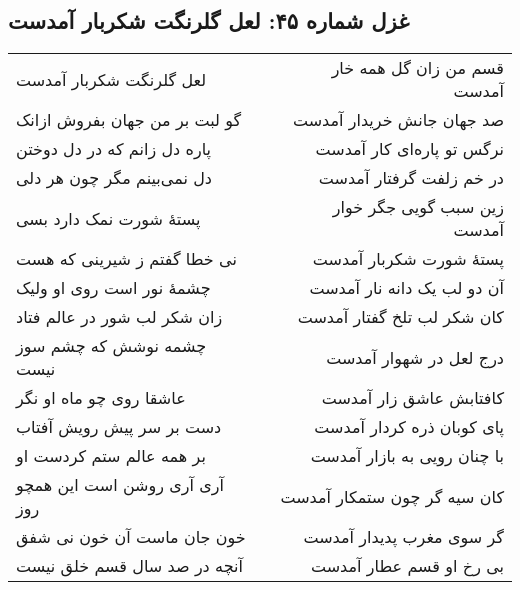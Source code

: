 \begin{center}
\section*{غزل شماره ۴۵: لعل گلرنگت شکربار آمدست}
\label{sec:045}
\begin{longtable}{l p{0.5cm} r}
لعل گلرنگت شکربار آمدست
&&
قسم من زان گل همه خار آمدست
\\
گو لبت بر من جهان بفروش ازانک
&&
صد جهان جانش خریدار آمدست
\\
پاره دل زانم که در دل دوختن
&&
نرگس تو پاره‌ای کار آمدست
\\
دل نمی‌بینم مگر چون هر دلی
&&
در خم زلفت گرفتار آمدست
\\
پستهٔ شورت نمک دارد بسی
&&
زین سبب گویی جگر خوار آمدست
\\
نی خطا گفتم ز شیرینی که هست
&&
پستهٔ شورت شکربار آمدست
\\
چشمهٔ نور است روی او ولیک
&&
آن دو لب یک دانه نار آمدست
\\
زان شکر لب شور در عالم فتاد
&&
کان شکر لب تلخ گفتار آمدست
\\
چشمه نوشش که چشم سوز نیست
&&
درج لعل در شهوار آمدست
\\
عاشقا روی چو ماه او نگر
&&
کافتابش عاشق زار آمدست
\\
دست بر سر پیش رویش آفتاب
&&
پای کوبان ذره کردار آمدست
\\
بر همه عالم ستم کردست او
&&
با چنان رویی به بازار آمدست
\\
آری آری روشن است این همچو روز
&&
کان سیه گر چون ستمکار آمدست
\\
خون جان ماست آن خون نی شفق
&&
گر سوی مغرب پدیدار آمدست
\\
آنچه در صد سال قسم خلق نیست
&&
بی رخ او قسم عطار آمدست
\\
\end{longtable}
\end{center}
